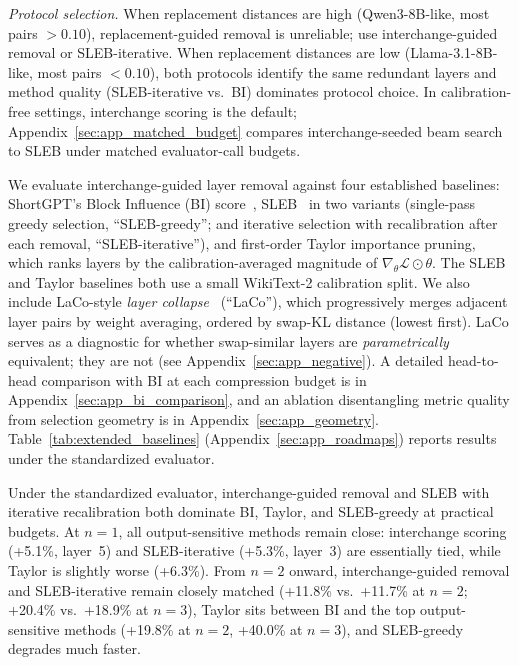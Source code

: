 \documentclass{article}
\begin{document}
\begin{tcolorbox}[colback=gray!8, colframe=gray!40, boxrule=0.5pt, left=4pt, right=4pt, top=3pt, bottom=3pt]
\emph{Protocol selection.} When replacement distances are high (Qwen3-8B-like, most pairs $>0.10$), replacement-guided removal is unreliable; use interchange-guided removal or SLEB-iterative. When replacement distances are low (Llama-3.1-8B-like, most pairs $<0.10$), both protocols identify the same redundant layers and method quality (SLEB-iterative vs.\ BI) dominates protocol choice. In calibration-free settings, interchange scoring is the default; Appendix~\ref{sec:app_matched_budget} compares interchange-seeded beam search to SLEB under matched evaluator-call budgets.
\end{tcolorbox}

We evaluate interchange-guided layer removal against four established baselines: ShortGPT's Block Influence (BI) score~\citep{men2024shortgpt}, SLEB~\citep{song2024sleb} in two variants (single-pass greedy selection, ``SLEB-greedy''; and iterative selection with recalibration after each removal, ``SLEB-iterative''), and first-order Taylor importance pruning, which ranks layers by the calibration-averaged magnitude of $\nabla_\theta \mathcal{L} \odot \theta$. The SLEB and Taylor baselines both use a small WikiText-2 calibration split. We also include LaCo-style \emph{layer collapse}~\citep{yang2024laco} (``LaCo''), which progressively merges adjacent layer pairs by weight averaging, ordered by swap-KL distance (lowest first). LaCo serves as a diagnostic for whether swap-similar layers are \emph{parametrically} equivalent; they are not (see Appendix~\ref{sec:app_negative}). A detailed head-to-head comparison with BI at each compression budget is in Appendix~\ref{sec:app_bi_comparison}, and an ablation disentangling metric quality from selection geometry is in Appendix~\ref{sec:app_geometry}. Table~\ref{tab:extended_baselines} (Appendix~\ref{sec:app_roadmaps}) reports results under the standardized evaluator.

Under the standardized evaluator, interchange-guided removal and SLEB with iterative recalibration both dominate BI, Taylor, and SLEB-greedy at practical budgets. At $n{=}1$, all output-sensitive methods remain close: interchange scoring (+5.1\%, layer~5) and SLEB-iterative (+5.3\%, layer~3) are essentially tied, while Taylor is slightly worse (+6.3\%). From $n{=}2$ onward, interchange-guided removal and SLEB-iterative remain closely matched (+11.8\% vs.\ +11.7\% at $n{=}2$; +20.4\% vs.\ +18.9\% at $n{=}3$), Taylor sits between BI and the top output-sensitive methods (+19.8\% at $n{=}2$, +40.0\% at $n{=}3$), and SLEB-greedy degrades much faster.
\end{document}
